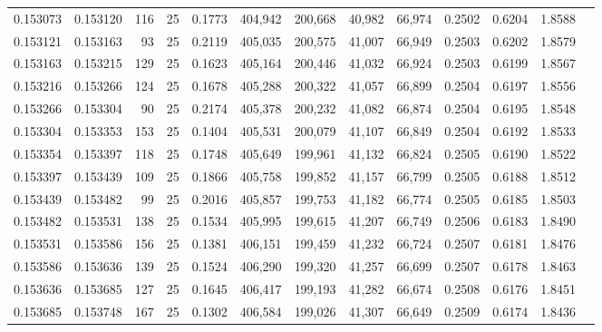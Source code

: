 \begin{tabular}{rrrrrrrrrrrrr}
0.153073 & 0.153120 &   116 &  25 &                                     0.1773 & 404,942 & 200,668 &  40,982 &  66,974 & 0.2502 & 0.6204 & 1.8588 \\
0.153121 & 0.153163 &    93 &  25 &                                     0.2119 & 405,035 & 200,575 &  41,007 &  66,949 & 0.2503 & 0.6202 & 1.8579 \\
0.153163 & 0.153215 &   129 &  25 &                                     0.1623 & 405,164 & 200,446 &  41,032 &  66,924 & 0.2503 & 0.6199 & 1.8567 \\
0.153216 & 0.153266 &   124 &  25 &                                     0.1678 & 405,288 & 200,322 &  41,057 &  66,899 & 0.2504 & 0.6197 & 1.8556 \\
0.153266 & 0.153304 &    90 &  25 &                                     0.2174 & 405,378 & 200,232 &  41,082 &  66,874 & 0.2504 & 0.6195 & 1.8548 \\
0.153304 & 0.153353 &   153 &  25 &                                     0.1404 & 405,531 & 200,079 &  41,107 &  66,849 & 0.2504 & 0.6192 & 1.8533 \\
0.153354 & 0.153397 &   118 &  25 &                                     0.1748 & 405,649 & 199,961 &  41,132 &  66,824 & 0.2505 & 0.6190 & 1.8522 \\
0.153397 & 0.153439 &   109 &  25 &                                     0.1866 & 405,758 & 199,852 &  41,157 &  66,799 & 0.2505 & 0.6188 & 1.8512 \\
0.153439 & 0.153482 &    99 &  25 &                                     0.2016 & 405,857 & 199,753 &  41,182 &  66,774 & 0.2505 & 0.6185 & 1.8503 \\
0.153482 & 0.153531 &   138 &  25 &                                     0.1534 & 405,995 & 199,615 &  41,207 &  66,749 & 0.2506 & 0.6183 & 1.8490 \\
0.153531 & 0.153586 &   156 &  25 &                                     0.1381 & 406,151 & 199,459 &  41,232 &  66,724 & 0.2507 & 0.6181 & 1.8476 \\
0.153586 & 0.153636 &   139 &  25 &                                     0.1524 & 406,290 & 199,320 &  41,257 &  66,699 & 0.2507 & 0.6178 & 1.8463 \\
0.153636 & 0.153685 &   127 &  25 &                                     0.1645 & 406,417 & 199,193 &  41,282 &  66,674 & 0.2508 & 0.6176 & 1.8451 \\
0.153685 & 0.153748 &   167 &  25 &                                     0.1302 & 406,584 & 199,026 &  41,307 &  66,649 & 0.2509 & 0.6174 & 1.8436 \\

\end{tabular}
